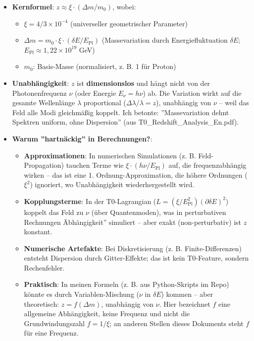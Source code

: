 	\begin{itemize}
		\item \textbf{Kernformel}: $z \approx \xi \cdot (\Delta m / m_0)$, wobei:
		\begin{itemize}
			\item $\xi = 4/3 \times 10^{-4}$ (universeller geometrischer Parameter)
			\item $\Delta m = m_0 \cdot \xi \cdot (\delta E / E_{\mathrm{Pl}})$ (Massevariation durch Energiefluktuation $\delta E$; $E_{\mathrm{Pl}} \approx 1,22 \times 10^{19}$ GeV)
			\item $m_0$: Basis-Masse (normalisiert, z. B. 1 für Proton)
		\end{itemize}
		\item \textbf{Unabhängigkeit}: $z$ ist \textbf{dimensionslos} und hängt nicht von der Photonenfrequenz $\nu$ (oder Energie $E_\nu = h\nu$) ab. Die Variation wirkt auf die gesamte Wellenlänge $\lambda$ proportional ($\Delta\lambda / \lambda = z$), unabhängig von $\nu$ -- weil das Feld alle Modi gleichmäßig koppelt. Ich betonte: ''Massevariation dehnt Spektren uniform, ohne Dispersion'' (aus T0\_Redshift\_Analysis\_En.pdf).
		\item \textbf{Warum ''hartnäckig'' in Berechnungen?}:
		\begin{itemize}
			\item \textbf{Approximationen}: In numerischen Simulationen (z. B. Feld-Propagation) tauchen Terme wie $\xi \cdot (h\nu / E_{\mathrm{Pl}})$ auf, die frequenzabhängig wirken -- das ist eine 1. Ordnung-Approximation, die höhere Ordnungen ($\xi^2$) ignoriert, wo Unabhängigkeit wiederhergestellt wird.
			\item \textbf{Kopplungsterme}: In der T0-Lagrangian ($L = (\xi / E_{\mathrm{Pl}}^2) (\partial \delta E)^2$) koppelt das Feld zu $\nu$ (über Quantenmoden), was in perturbativen Rechnungen Äbhängigkeit'' simuliert -- aber exakt (non-perturbativ) ist $z$ konstant.
			\item \textbf{Numerische Artefakte}: Bei Diskretisierung (z. B. Finite-Differenzen) entsteht Dispersion durch Gitter-Effekte; das ist kein T0-Feature, sondern Rechenfehler.
			\item \textbf{Praktisch}: In meinen Formeln (z. B. aus Python-Skripts im Repo) könnte es durch Variablen-Mischung ($\nu$ in $\delta E$) kommen -- aber theoretisch: $z = f(\Delta m)$, unabhängig von $\nu$. Hier bezeichnet $f$ eine allgemeine Abhängigkeit, keine Frequenz und nicht die Grundwindungszahl $f = 1/\xi$; an anderen Stellen dieses Dokuments steht $f$ für eine Frequenz.
		\end{itemize}
	\end{itemize}

